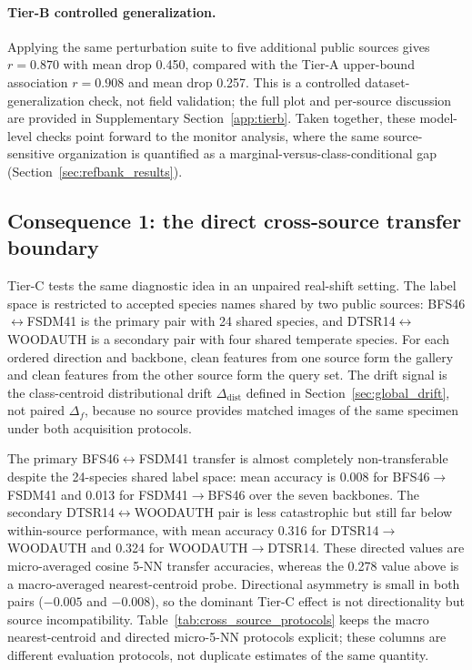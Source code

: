 \documentclass[a4paper,fleqn]{els-cas-templates/cas-sc}
\begin{document}
\paragraph{Tier-B controlled generalization.}

Applying the same perturbation suite to five additional public sources gives
$r=0.870$ with mean drop 0.450, compared with the Tier-A upper-bound association
$r=0.908$ and mean drop 0.257. This is a controlled dataset-generalization check,
not field validation; the full plot and per-source discussion are provided in
Supplementary Section~\ref{app:tierb}.
Taken together, these model-level checks point forward to the monitor analysis,
where the same source-sensitive organization is quantified as a
marginal-versus-class-conditional gap
(Section~\ref{sec:refbank_results}).

\subsection{Consequence 1: the direct cross-source transfer boundary}
\label{sec:tierc_cross_source}

Tier-C tests the same diagnostic idea in an unpaired real-shift setting. The
label space is restricted to accepted species names shared by two public sources:
BFS46$\leftrightarrow$FSDM41 is the primary pair with 24 shared species, and
DTSR14$\leftrightarrow$WOODAUTH is a secondary pair with four shared temperate
species. For each ordered direction and backbone, clean features from one source
form the gallery and clean features from the other source form the query set. The
drift signal is the class-centroid distributional drift
$\Delta_{\mathrm{dist}}$ defined in Section~\ref{sec:global_drift}, not paired
$\Delta_f$, because no source provides matched images of the same specimen
under both acquisition protocols.

The primary BFS46$\leftrightarrow$FSDM41 transfer is almost completely
non-transferable despite the 24-species shared label space: mean accuracy is
0.008 for BFS46$\rightarrow$FSDM41 and 0.013 for FSDM41$\rightarrow$BFS46 over
the seven backbones. The secondary DTSR14$\leftrightarrow$WOODAUTH pair is less
catastrophic but still far below within-source performance, with mean accuracy
0.316 for DTSR14$\rightarrow$WOODAUTH and 0.324 for
WOODAUTH$\rightarrow$DTSR14. These directed values are micro-averaged cosine
5-NN transfer accuracies, whereas the 0.278 value above is a macro-averaged
nearest-centroid probe. Directional asymmetry is small in both pairs
($-0.005$ and $-0.008$), so the dominant Tier-C effect is not directionality but
source incompatibility. Table~\ref{tab:cross_source_protocols} keeps the macro
nearest-centroid and directed micro-5-NN protocols explicit; these columns are
different evaluation protocols, not duplicate estimates of the same quantity.
\end{document}
